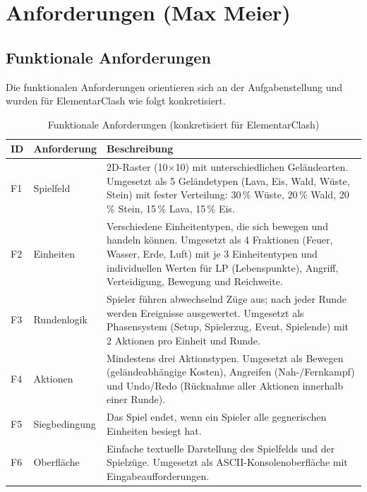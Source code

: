 \section{Anforderungen (Max Meier)}
\label{chap:anforderungen}


\subsection{Funktionale Anforderungen}
\label{sec:funktionale-anforderungen}

Die funktionalen Anforderungen orientieren sich an der Aufgabenstellung und wurden für ElementarClash wie folgt konkretisiert.

\begin{table}[H]
\centering
\begin{tabular}{l l p{9cm}}
\toprule
\textbf{ID} & \textbf{Anforderung} & \textbf{Beschreibung} \\
\midrule
F1 & Spielfeld & 2D-Raster (10$\times$10) mit unterschiedlichen Geländearten. Umgesetzt als 5 Geländetypen (Lava, Eis, Wald, Wüste, Stein) mit fester Verteilung: 30\,\% Wüste, 20\,\% Wald, 20\,\% Stein, 15\,\% Lava, 15\,\% Eis. \\
F2 & Einheiten & Verschiedene Einheitentypen, die sich bewegen und handeln können. Umgesetzt als 4 Fraktionen (Feuer, Wasser, Erde, Luft) mit je 3 Einheitentypen und individuellen Werten für LP (Lebenspunkte), Angriff, Verteidigung, Bewegung und Reichweite. \\
F3 & Rundenlogik & Spieler führen abwechselnd Züge aus; nach jeder Runde werden Ereignisse ausgewertet. Umgesetzt als Phasensystem (Setup, Spielerzug, Event, Spielende) mit 2 Aktionen pro Einheit und Runde. \\
F4 & Aktionen & Mindestens drei Aktionstypen. Umgesetzt als Bewegen (geländeabhängige Kosten), Angreifen (Nah-/Fernkampf) und Undo/Redo (Rücknahme aller Aktionen innerhalb einer Runde). \\
F5 & Siegbedingung & Das Spiel endet, wenn ein Spieler alle gegnerischen Einheiten besiegt hat. \\
F6 & Oberfläche & Einfache textuelle Darstellung des Spielfelds und der Spielzüge. Umgesetzt als ASCII-Konsolenoberfläche mit Eingabeaufforderungen. \\
\bottomrule
\end{tabular}
\caption{Funktionale Anforderungen (konkretisiert für ElementarClash)}
\label{tab:funktionale-anforderungen}
\end{table}

